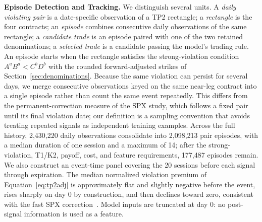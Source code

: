 \documentclass[sigconf,review]{acmart}
\begin{document}
\smallskip\noindent\textbf{Episode Detection and Tracking.}
\label{sec:episode-tracking}
We distinguish several units. A \emph{daily violating pair} is a date-specific observation of a TP2 rectangle; a \emph{rectangle} is the four contracts; an \emph{episode} combines consecutive daily observations of the same rectangle; a \emph{candidate trade} is an episode paired with one of the two retained denominations; a \emph{selected trade} is a candidate passing the model's trading rule.
An episode starts when the rectangle satisfies the strong-violation condition $A^aB^a<C^bD^b$ with the rounded forward-adjusted strikes of Section~\ref{sec:denominations}. Because the same violation can persist for several days, we merge consecutive observations keyed on the same near-leg contract into a single episode rather than count the same event repeatedly. This differs from the permanent-correction measure of the SPX study, which follows a fixed pair until its final violation date; our definition is a sampling convention that avoids treating repeated signals as independent training examples. Across the full history, 2{,}430{,}220 daily observations consolidate into 2{,}098{,}213 pair episodes, with a median duration of one session and a maximum of 14; after the strong-violation, T1/K2, payoff, cost, and feature requirements, 177{,}487 episodes remain.
We also construct an event-time panel covering the 20 sessions before each signal through expiration. The median normalized violation premium of Equation~\eqref{eq:tp2adj} is approximately flat and slightly negative before the event, rises sharply on day 0 by construction, and then declines toward zero, consistent with the fast SPX correction~\cite{glasserman2025tp2}. Model inputs are truncated at day 0: no post-signal information is used as a feature.
\end{document}
